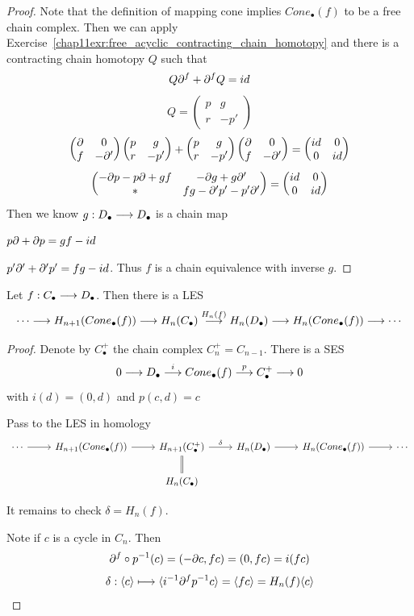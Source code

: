 \documentclass[11pt]{book} %
\begin{document}
\begin{proof}
Note that the definition of mapping cone implies $Cone_\bullet(f)$ to be a free chain complex. Then we can apply Exercise~\ref{chap11exr:free_acyclic_contracting_chain_homotopy} and there is a contracting chain homotopy
$Q$ such that $$
Q{\partial}^f+{\partial}^f Q=id
$$
$$
Q=
\begin{pmatrix}
p & g\\
r & -p'
\end{pmatrix}
$$
$$
\begin{pmatrix}
{\partial} & 0\\
f & -{\partial}'
\end{pmatrix}
\begin{pmatrix}
p & g\\
r & -p'
\end{pmatrix}
+
\begin{pmatrix}
p & g\\
r & -p'
\end{pmatrix}
\begin{pmatrix}
{\partial} & 0\\
f & -{\partial}'
\end{pmatrix}
=\begin{pmatrix}
id & 0\\
0 & id
\end{pmatrix}
$$
$$
\begin{pmatrix}
-{\partial} p-p{\partial} +gf & -{\partial} g+g {\partial}'\\
* & fg-{\partial}' p'-p'{\partial}'
\end{pmatrix}=
\begin{pmatrix}
id & 0\\
0 & id
\end{pmatrix}
$$
Then we know 
$g:D_\bullet \longrightarrow D_\bullet$ is a chain map

$p{\partial} +{\partial} p=gf-id$

$p'{\partial}'+{\partial}'p'=fg-id$. Thus $f$ is a chain equivalence with inverse $g$.
\end{proof}
\begin{lemma}
Let $f: C_\bullet\longrightarrow D_\bullet$. Then there is a LES
$$
\cdots\longrightarrow H_{n+1}(Cone_\bullet(f))\longrightarrow H_n(C_\bullet)\overset{H_{n}(f)}{\longrightarrow} H_n (D_\bullet)\longrightarrow H_n(Cone_\bullet(f))\longrightarrow \cdots
$$
\end{lemma}
\begin{proof}
Denote by $C^+_\bullet$ the chain complex $C^+_n=C_{n-1}$. There is a SES
$$
0\longrightarrow D_\bullet\overset{i}{\longrightarrow} Cone_\bullet(f)\overset{p}{\longrightarrow} C^+_\bullet\longrightarrow 0
$$
with $i(d)=(0,d)$ and $p (c,d)=c$

Pass to the LES in homology
\[
\begin{tikzcd}
\cdots  \arrow[r] & H_{n+1}(Cone_\bullet(f)) \arrow[r] & H_{n+1}(C^+_\bullet) \arrow[r,"\delta"] \arrow[d, equal] & H_n(D_\bullet) \arrow[r] & H_n(Cone_\bullet(f)) \arrow[r] & \cdots \\
 &  & H_n(C_\bullet) &  &  & 
\end{tikzcd}
\]

It remains to check $\delta=H_n(f)$.


Note if $c$ is a cycle in $C_n$. Then 
$$
{\partial}^f\circ p^{-1}(c)=(-{\partial} c, fc)=(0,fc)=i(fc)
$$
$$
\delta:\langle c\rangle\longmapsto \langle i^{-1}{\partial}^fp^{-1}c\rangle=\langle fc\rangle= H_{n}(f)\langle c\rangle
$$
\end{proof}
\end{document}

